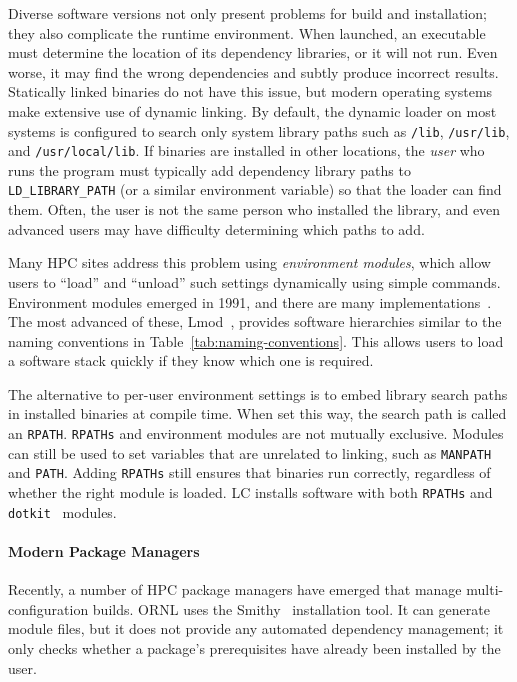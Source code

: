 Diverse software versions not only present problems for build and installation;
they also complicate the runtime environment. When launched, an executable
must determine the location of its dependency libraries, or it will not run.
Even worse, it may find the wrong dependencies and subtly produce incorrect results.
Statically linked binaries do not have this issue, but modern
operating systems make extensive use of dynamic linking.
By default, the dynamic loader on most systems is configured to search only
system library paths such as {\tt /lib}, {\tt /usr/lib}, and
{\tt /usr/local/lib}.  If binaries are installed in other locations, the
{\it user} who runs the program must typically add dependency library paths to
{\tt LD\_LIBRARY\_PATH} (or a similar environment variable) so that the loader
can find them.  Often, the user is not the same person who installed the library,
and even advanced users may have difficulty determining which paths to add.

Many HPC sites address this problem using {\it environment modules}, which
allow users to ``load'' and ``unload'' such settings dynamically using simple
commands. Environment modules emerged in 1991, and there are many implementations~\cite{dotkit,furlani+:lisa91,furlani+:lisa96,mclay:lmod,mclay:lmod-tutorial}.
The most advanced of these, Lmod~\cite{mclay:lmod,mclay:lmod-tutorial},
provides software hierarchies similar to the naming conventions in
Table~\ref{tab:naming-conventions}. This allows users to load a software stack
quickly if they know which one is required.

The alternative to per-user environment settings is to embed library search
paths in installed binaries at compile time. When set this way, the search
path is called an {\tt RPATH}. {\tt RPATHs} and environment modules are not
mutually exclusive. Modules can still be used to set variables that are
unrelated to linking, such as {\tt MANPATH} and {\tt PATH}.  Adding
{\tt RPATHs} still ensures that binaries run correctly,
regardless of whether the right module is loaded. LC installs software with
both {\tt RPATHs} and {\tt dotkit}~\cite{dotkit} modules.

\paragraph{Modern Package Managers}

Recently, a number of HPC package managers have emerged that manage
multi-configuration builds.
%
ORNL uses the Smithy~\cite{digirolamo:smithy} installation tool. It
can generate module files, but it does not provide any
automated dependency management; it only checks whether a package's
prerequisites have already been installed by the user.

